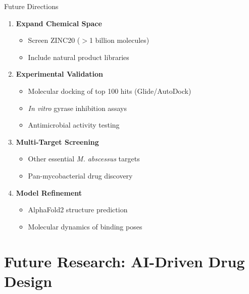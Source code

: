 \documentclass[aspectratio=169,xcolor=table]{beamer}
\begin{document}
\begin{frame}{Future Directions}
\begin{enumerate}\setlength{\itemsep}{4pt}
    \item \textbf{Expand Chemical Space}
    \begin{itemize}\setlength{\itemsep}{0pt}
        \item Screen ZINC20 ($>$1 billion molecules)
        \item Include natural product libraries
    \end{itemize}
    
    \item \textbf{Experimental Validation}
    \begin{itemize}\setlength{\itemsep}{0pt}
        \item Molecular docking of top 100 hits (Glide/AutoDock)
        \item \textit{In vitro} gyrase inhibition assays
        \item Antimicrobial activity testing
    \end{itemize}
    
    \item \textbf{Multi-Target Screening}
    \begin{itemize}\setlength{\itemsep}{0pt}
        \item Other essential \textit{M. abscessus} targets
        \item Pan-mycobacterial drug discovery
    \end{itemize}
    
    \item \textbf{Model Refinement}
    \begin{itemize}\setlength{\itemsep}{0pt}
        \item AlphaFold2 structure prediction
        \item Molecular dynamics of binding poses
    \end{itemize}
\end{enumerate}
\end{frame}

\section{Future Research: AI-Driven Drug Design}
\end{document}
